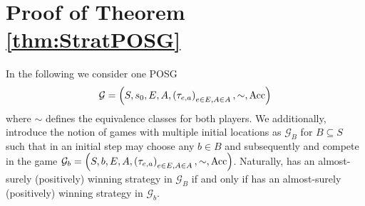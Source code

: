 \chapter{Proof of Theorem \ref{thm:StratPOSG}}
In the following we consider one \ac{POSG}
\begin{equation*}
  \mathcal{G} = \left(S, s_{0}, E, A, \left(\tau_{e,a}\right)_{e\in E, A\in A}, 
    \sim, \operatorname{Acc}\right)
\end{equation*}
where $\sim$ defines the equivalence classes for both players. We 
additionally, introduce the notion of games with multiple initial locations 
as $\mathcal{G}_{B}$ for $B\subseteq S$ such that in an initial step \adam{}
may choose any $b\in B$ and subsequently \eve{} and \adam{} compete in the
game $\mathcal{G}_{b} = \left(S, b, E, A, 
\left(\tau_{e,a}\right)_{e\in E, A\in A}, \sim, \operatorname{Acc}\right)$. Naturally, \eve{} has an 
almost-surely (positively) winning strategy in $\mathcal{G}_{B}$ if and only 
if \eve{} has an almost-surely (positively) winning strategy in 
$\mathcal{G}_{b}$.

